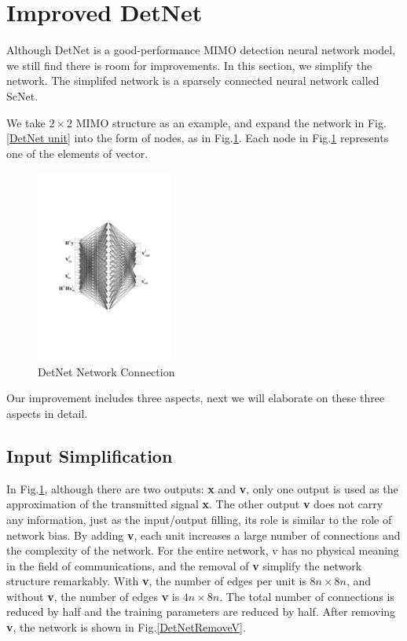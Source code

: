 \documentclass[conference]{IEEEtran}
\begin{document}
\section{Improved DetNet}

Although DetNet is a good-performance MIMO detection neural network model, we still find there is room for improvements. In this section, we simplify the network. The simplifed network is a sparsely connected neural network called ScNet.

We take ${2 \times 2}$ MIMO structure as an example, and expand the network in Fig.\ref{DetNet unit} into the form of nodes, as in Fig.\ref{DetNetConnect}. Each node in Fig.\ref{DetNetConnect} represents one of the elements of vector.
\begin{figure}[ht]
  \centering
  \includegraphics[width=0.4\textwidth]{DetNetConnect.pdf}
  \caption{DetNet Network Connection}
  \label{DetNetConnect}
\end{figure}

Our improvement includes three aspects, next we will elaborate on these three aspects in detail.

\subsection{Input Simplification} In Fig.\ref{DetNetConnect}, although there are two outputs: \textbf{x} and \textbf{v}, only one output is used as the approximation of the transmitted signal \textbf{x}. The other output \textbf{v} does not carry any information, just as the input/output filling, its role is similar to the role of network bias. By adding \textbf{v}, each unit increases a large number of connections and the complexity of the network. For the entire network, \textrm{v} has no physical meaning in the field of communications, and the removal of \textbf{v} simplify the network structure remarkably. With \textbf{v}, the number of edges per unit is ${8n \times 8n}$, and without \textbf{v}, the number of edges \textbf{v} is ${4n \times 8n}$. The total number of connections is reduced by half and the training parameters are reduced by half. After removing \textbf{v}, the network is shown in Fig.\ref{DetNetRemoveV}.
\end{document}
